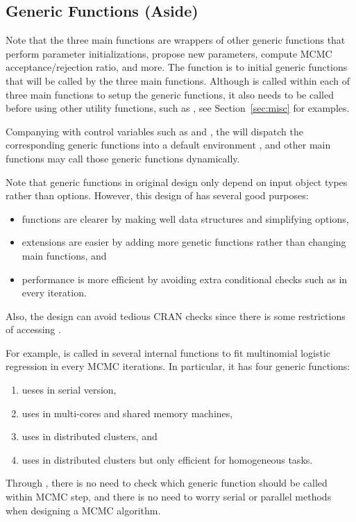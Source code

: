 \subsection[Generic Functions (Aside)]{Generic Functions (Aside)}
\label{sec:generic_functions}

Note that the three main functions are wrappers of other generic functions that
perform parameter initializations, propose new parameters, compute
MCMC acceptance/rejection ratio, and more.
The function  is to initial generic functions that
will be called by the three main functions.
Although  is called within each of three main
functions to setup the generic functions, it also needs to be called before
using other utility functions, such as , see
Section~\ref{sec:misc} for examples.

Companying with control variables such as  and ,
the  will dispatch the
corresponding generic functions into a default environment ,
and other main functions may call those generic functions dynamically.

Note that generic functions in original  design only depend on
input object types rather than options.
However, this design of  has several good purposes:
\begin{itemize}
\item functions are clearer by making well data structures and
      simplifying options,
\item extensions are easier by adding more genetic functions rather than
      changing main functions, and
\item performance is more efficient by avoiding extra
      conditional checks such as 
      in every iteration.
\end{itemize}
Also, the design can avoid tedious CRAN checks since there is some restrictions
of accessing .

For example,  is called in several
internal functions to fit multinomial logistic regression in every MCMC
iterations. In particular, it has four generic functions:
\begin{enumerate}
\item {} ueses  in serial version,
\item {} uses 
      in multi-cores and shared memory machines,
\item {} uses 
      in distributed clusters, and
\item {} uses 
      in distributed clusters but only efficient for homogeneous tasks.
\end{enumerate}
Through , there is no need to check which generic
function should be called within MCMC step, and there is no need to worry
serial or parallel methods when designing a MCMC algorithm.

